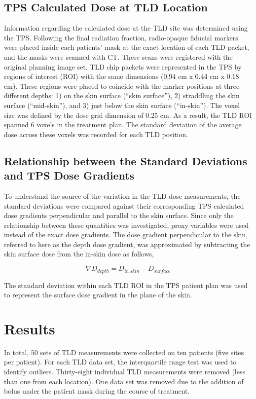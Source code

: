 \subsection{TPS Calculated Dose at TLD Location}
Information regarding the calculated dose at the TLD site was determined using the TPS. Following the final radiation fraction, radio-opaque fiducial markers were placed inside each patients’ mask at the exact location of each TLD packet, and the masks were scanned with CT. These scans were registered with the original planning image set. TLD chip packets were represented in the TPS by regions of interest (ROI) with the same dimensions (0.94 cm x 0.44 cm x 0.18 cm). These regions were placed to coincide with the marker positions at three different depths: 1) on the skin surface (“skin surface”), 2) straddling the skin surface (“mid-skin”), and 3) just below the skin surface (“in-skin”). The voxel size was defined by the dose grid dimension of 0.25 cm. As a result, the TLD ROI spanned 6 voxels in the treatment plan. The standard deviation of the average dose across these voxels was recorded for each TLD position.

\subsection{Relationship between the Standard Deviations and TPS Dose Gradients}
To understand the source of the variation in the TLD dose measurements, the standard deviations were compared against their corresponding TPS calculated dose gradients perpendicular and parallel to the skin surface. Since only the relationship between these quantities was investigated, proxy variables were used instead of the exact dose gradients. The dose gradient perpendicular to the skin, referred to here as the depth dose gradient, was approximated by subtracting the skin surface dose from the in-skin dose as follows,

\begin{equation}
	\nabla D_{depth} = D_{in~skin} - D_{surface}	
\end{equation}

The standard deviation within each TLD ROI in the TPS patient plan was used to represent the surface dose gradient in the plane of the skin.

\section{Results}
In total, 50 sets of TLD measurements were collected on ten patients (five sites per patient). For each TLD data set, the interquartile range test was used to identify outliers. Thirty-eight individual TLD measurements were removed (less than one from each location). One data set was removed due to the addition of bolus under the patient mask during the course of treatment.

